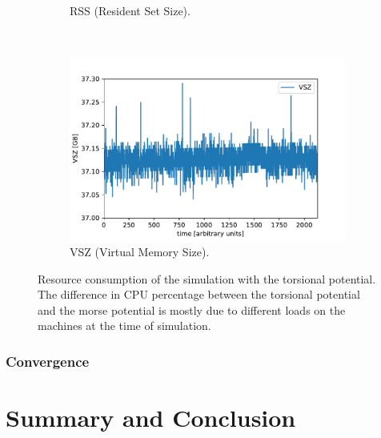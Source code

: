 \documentclass[11pt, a4paper, oneside]{article}
\begin{document}
\begin{figure}[h]
\begin{subfigure}[b]{0.5 \textwidth}
    \caption{RSS (Resident Set Size).}
  \end{subfigure}
  ~
  \begin{subfigure}[b]{0.5 \textwidth}
    \includegraphics[width = \textwidth]{../parser/cospot_VSZ.pdf}
    \caption{VSZ (Virtual Memory Size).}
  \end{subfigure}
  \caption{Resource consumption of the simulation with the torsional potential. The difference in CPU percentage between the torsional potential and the morse potential is mostly due to different loads on the machines at the time of simulation.}
  \label{fig:cos_resource}
\end{figure}


\subsubsection{Convergence}



\section{Summary and Conclusion}
\end{document}
